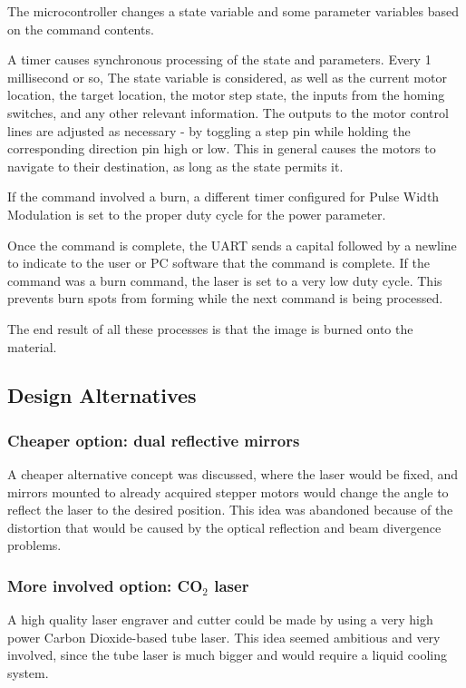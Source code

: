 \documentclass[11pt]{LaTeX-Classes/math-hw}
\begin{document}
The microcontroller changes a state variable and some parameter variables based on the command contents.

A timer causes synchronous processing of the state and parameters. Every 1 millisecond or so,
The state variable is considered, as well as the current motor location, the target location,
the motor step state, the inputs from the homing switches, and any other relevant information.
The outputs to the motor control lines are adjusted as necessary - by toggling a step pin while
holding the corresponding direction pin high or low.
This in general causes the motors to navigate
to their destination, as long as the state permits it.

If the command involved a burn, a different timer configured for Pulse Width Modulation is set
to the proper duty cycle for the power parameter.

Once the command is complete, the UART sends a capital  followed by a newline
to indicate to the user or PC software that the command is complete.
If the command was a burn command, the laser is set to a very low duty cycle. This prevents
burn spots from forming while the next command is being processed.

The end result of all these processes is that the image is burned onto the material.

\subsection{Design Alternatives}
\subsubsection{Cheaper option: dual reflective mirrors}
A cheaper alternative concept was discussed, where the laser would be fixed, and
mirrors mounted to already acquired stepper motors would change the angle to reflect
the laser to the desired position. This idea was abandoned because of the distortion
that would be caused by the optical reflection and beam divergence problems.

\subsubsection{More involved option: CO$_2$ laser}
A high quality laser engraver and cutter could be made by using a very high power Carbon Dioxide-based
tube laser. This idea seemed ambitious and very involved, since the tube laser is much bigger
and would require a liquid cooling system.
\end{document}
